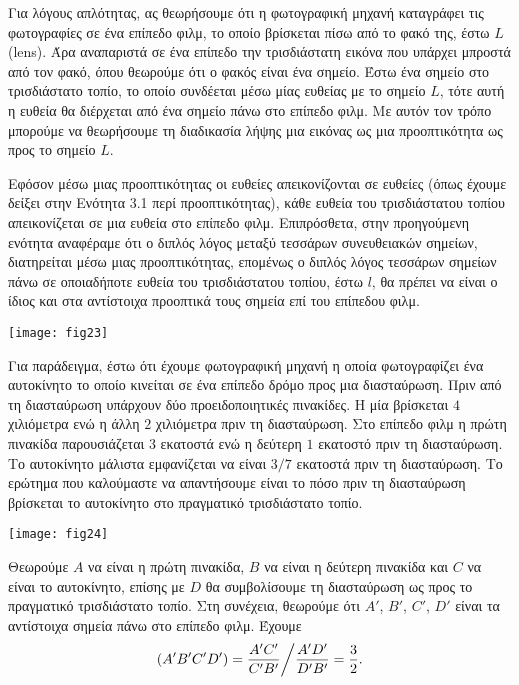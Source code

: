 \documentclass[12pt, a4paper]{book}
\begin{document}
Για λόγους απλότητας, ας θεωρήσουμε ότι η φωτογραφική μηχανή καταγράφει τις φωτογραφίες σε ένα επίπεδο φιλμ, το οποίο βρίσκεται πίσω από το φακό της, έστω  $L$ \textlatin{ (lens)}. Άρα αναπαριστά σε ένα επίπεδο την τρισδιάστατη εικόνα που υπάρχει μπροστά από τον φακό, όπου θεωρούμε ότι ο φακός είναι ένα σημείο. Έστω ένα σημείο στο τρισδιάστατο τοπίο, το οποίο συνδέεται μέσω μίας ευθείας με το σημείο $L$, τότε αυτή η ευθεία θα διέρχεται από ένα σημείο πάνω στο επίπεδο φιλμ. Με αυτόν τον τρόπο μπορούμε να θεωρήσουμε τη διαδικασία λήψης μια εικόνας ως μια προοπτικότητα ως προς το σημείο $L$.

Εφόσον μέσω μιας προοπτικότητας οι ευθείες απεικονίζονται σε ευθείες (όπως έχουμε δείξει στην Ενότητα 3.1 περί προοπτικότητας), κάθε ευθεία του τρισδιάστατου τοπίου απεικονίζεται σε μια ευθεία στο επίπεδο φιλμ. Επιπρόσθετα, στην προηγούμενη ενότητα αναφέραμε ότι ο διπλός λόγος μεταξύ τεσσάρων συνευθειακών σημείων, διατηρείται μέσω μιας προοπτικότητας, επομένως ο διπλός λόγος τεσσάρων σημείων πάνω σε οποιαδήποτε ευθεία του τρισδιάστατου τοπίου, έστω $l$, θα πρέπει να είναι ο ίδιος και στα αντίστοιχα προοπτικά τους σημεία επί του επίπεδου φιλμ.

\begin{center}
\texttt{[image: fig23]}
\end{center}

Για παράδειγμα, έστω ότι έχουμε φωτογραφική μηχανή η οποία φωτογραφίζει ένα αυτοκίνητο το οποίο κινείται σε ένα επίπεδο δρόμο προς μια διασταύρωση. Πριν από τη διασταύρωση υπάρχουν δύο προειδοποιητικές πινακίδες. Η μία βρίσκεται $4$ χιλιόμετρα ενώ η άλλη $2$ χιλιόμετρα πριν τη διασταύρωση. Στο επίπεδο φιλμ η πρώτη πινακίδα παρουσιάζεται $3$ εκατοστά ενώ η δεύτερη $1$ εκατοστό πριν τη διασταύρωση. Το αυτοκίνητο μάλιστα εμφανίζεται να είναι $3/7$ εκατοστά πριν τη διασταύρωση. Το ερώτημα που καλούμαστε να απαντήσουμε είναι το πόσο πριν τη διασταύρωση βρίσκεται το αυτοκίνητο στο πραγματικό τρισδιάστατο τοπίο.

\begin{center}
\texttt{[image: fig24]}
\end{center}

Θεωρούμε $A$ να είναι η πρώτη πινακίδα, $B$ να είναι η δεύτερη πινακίδα και $C$ να είναι το αυτοκίνητο, επίσης με $D$ θα συμβολίσουμε τη διασταύρωση ως προς το πραγματικό τρισδιάστατο τοπίο. Στη συνέχεια, θεωρούμε ότι $A'$, $B'$, $C'$, $D'$ είναι τα αντίστοιχα σημεία πάνω στο επίπεδο φιλμ. Έχουμε
\begin{displaymath}
(A'B'C'D')=\frac{A'C'}{C'B'}\bigg{/}\frac{A'D'}{D'B'}=\frac{3}{2}.
\end{displaymath}
\end{document}
